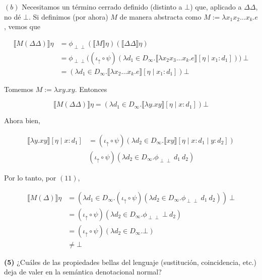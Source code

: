 \documentclass[article, 12pt]{article}
\newcommand{\ind}{\perp\!\!\!\perp}
\begin{document}
$(b)$ Necesitamos un término cerrado definido (distinto a $\bot $) que, aplicado
a $\Delta\Delta$, no dé $\bot$. Si definimos (por ahora) $M$ de manera
abstracta como $M := \lambda x_1x_2\ldots x_k.e$, vemos que

\begin{align*}
  \llbracket M(\Delta \Delta) \rrbracket\eta 
  &=\phi_{\ind} (\llbracket M \rrbracket\eta) \left( \llbracket \Delta \Delta
  \rrbracket\eta \right)  \\ 
  &= \phi_{\ind} \Big((\iota_{\uparrow} \circ \psi)(\lambda d_1 \in
  D_\infty.\llbracket \lambda x_2 x_3 \ldots x_k.e \rrbracket[\eta \mid x_1 : d_1 ]) \Big) ~ \bot  \\ 
  &= (\lambda d_1 \in D_\infty.\llbracket \lambda x_2\ldots x_k.e \rrbracket[\eta \mid x_1 : d_1 ]) \bot 
\end{align*}

Tomemos $M :=  \lambda xy.xy$. Entonces

\begin{equation}
  \llbracket M(\Delta \Delta) \rrbracket\eta 
  = (\lambda d_1 \in
  D_\infty.\llbracket \lambda y.xy \rrbracket[\eta \mid x : d_1]) \bot
\end{equation}

Ahora bien, 

\begin{align*}
  \llbracket \lambda y.xy \rrbracket[\eta \mid x : d_1] 
  &=(\iota_{\uparrow} \circ \psi) (\lambda d_2 \in D_\infty.\llbracket xy
  \rrbracket[\eta \mid x : d_1 \mid y : d_2]) \\ 
  &(\iota_{\uparrow} \circ \psi)(\lambda d_2 \in D_\infty.\phi_{\ind} ~ d_1 ~ d_2)
\end{align*}

Por lo tanto, por $(11)$, 

\begin{align*}
  \llbracket M(\Delta) \rrbracket\eta 
  &=(\lambda d_1 \in D_\infty.(\iota_{\uparrow} \circ \psi)(\lambda d_2 \in
  D_\infty.\phi_{\ind} ~ d_1 ~ d_2) ) ~ \bot  \\ 
  &=(\iota_{\uparrow} \circ \psi) (\lambda d_2 \in D_\infty.\phi_{\ind} ~ \bot
  ~ d_2) \\ 
  &=(\iota_{\uparrow} \circ \psi)(\lambda d_2 \in D_\infty. \bot ) \\ 
  &\neq \bot 
\end{align*}

\pagebreak 

\begin{myframe}
  \textbf{(5)} ¿Cuáles de las propiedades bellas del lenguaje (sustitución,
  coincidencia, etc.) deja de valer en la semántica denotacional normal?
\end{myframe}
\end{document}
